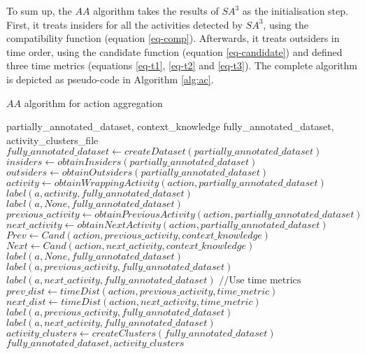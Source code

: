 To sum up, the $AA$ algorithm takes the results of $SA^3$ as the initialisation step. First, it treats insiders for all the activities detected by $SA^3$, using the compatibility function (equation \ref{eq-comp}). Afterwards, it treats outsiders in time order, using the candidate function (equation \ref{eq-candidate}) and defined three time metrics (equations \ref{eq-t1}, \ref{eq-t2} and \ref{eq-t3}). The complete algorithm is depicted as pseudo-code in Algorithm \ref{alg:ac}.

\begin{algorithm}
 \caption{$AA$ algorithm for action aggregation}
 \label{alg:ac}
 \begin{algorithmic}
 \REQUIRE partially\_annotated\_dataset, context\_knowledge
 \ENSURE fully\_annotated\_dataset, activity\_clusters\_file
 \STATE $fully\_annotated\_dataset \leftarrow createDataset(partially\_annotated\_dataset)$
 \STATE $insiders \leftarrow obtainInsiders(partially\_annotated\_dataset)$
 \STATE $outsiders \leftarrow obtainOutsiders(partially\_annotated\_dataset)$ 
  \STATE $activity \leftarrow obtainWrappingActivity(action, partially\_annotated\_dataset)$
    \STATE $label(a, activity, fully\_annotated\_dataset)$
  \ELSE
    \STATE $label(a, None, fully\_annotated\_dataset)$
  \ENDIF
 \ENDFOR 
  \STATE $previous\_activity \leftarrow obtainPreviousActivity(action, partially\_annotated\_dataset)$
  \STATE $next\_activity \leftarrow obtainNextActivity(action, partially\_annotated\_dataset)$
  \STATE $Prev \leftarrow Cand(action, previous\_activity, context\_knowledge)$
  \STATE $Next \leftarrow Cand(action, next\_activity, context\_knowledge)$
    \STATE $label(a, None, fully\_annotated\_dataset)$
    \STATE $label(a, previous\_activity, fully\_annotated\_dataset)$
    \STATE $label(a, next\_activity, fully\_annotated\_dataset)$
    \STATE $// \text{Use time metrics}$
    \STATE $prev\_dist \leftarrow timeDist(action, previous\_activity, time\_metric)$
    \STATE $next\_dist \leftarrow timeDist(action, next\_activity, time\_metric)$
      \STATE $label(a, previous\_activity, fully\_annotated\_dataset)$
    \ELSE
      \STATE $label(a, next\_activity, fully\_annotated\_dataset)$
    \ENDIF
  \ENDIF  
 \ENDFOR
 \STATE $activity\_clusters \leftarrow createClusters(fully\_annotated\_dataset)$
 \RETURN $fully\_annotated\_dataset, activity\_clusters$
 \end{algorithmic}
\end{algorithm}

